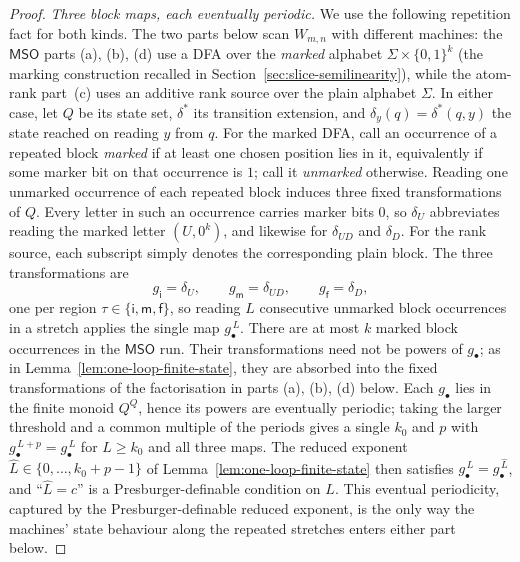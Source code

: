 \documentclass[10pt,a4paper]{amsart}
\newcommand{\MSO}{\mathsf{MSO}}
\begin{document}
\begin{proof}
\vspace{0.5em}
\noindent\emph{Three block maps, each eventually periodic.}
We use the following repetition fact for both kinds.  The two parts below
scan $W_{m,n}$ with different machines: the $\MSO$ parts
(a), (b), (d) use a DFA over the \emph{marked} alphabet
$\Sigma\times\{0,1\}^k$ (the marking construction recalled in
Section~\ref{sec:slice-semilinearity}), while the atom-rank part~(c) uses an additive
rank source over the plain alphabet $\Sigma$.  In either case, let $Q$ be its
state set, $\delta^*$ its transition extension, and $\delta_y(q)=\delta^*(q,y)$
the state reached on reading $y$ from $q$.  For the marked DFA, call an
occurrence of a repeated block \emph{marked} if at least one chosen position
lies in it, equivalently if some marker bit on that occurrence is $1$; call it
\emph{unmarked} otherwise.  Reading one unmarked occurrence of each repeated
block induces three fixed transformations of $Q$.  Every letter in such an
occurrence carries marker bits $0$, so $\delta_U$ abbreviates reading the
marked letter $(U,0^k)$, and likewise for $\delta_{UD}$ and $\delta_D$.  For
the rank source, each subscript simply denotes the corresponding plain block.
The three transformations are
\[
   g_{\mathsf i}=\delta_U,\qquad g_{\mathsf m}=\delta_{UD},\qquad
   g_{\mathsf f}=\delta_D,
\]
one per region $\tau\in\{\mathsf i,\mathsf m,\mathsf f\}$, so reading $L$
consecutive unmarked block occurrences in a stretch applies the single map
$g_\bullet^{\,L}$.  There are at most $k$ marked block occurrences in the
$\MSO$ run.  Their transformations need not be powers of $g_\bullet$; as in
Lemma~\ref{lem:one-loop-finite-state}, they are absorbed into the fixed
transformations of the factorisation in parts (a), (b), (d) below.  Each
$g_\bullet$ lies in the finite monoid $Q^Q$, hence its powers are
eventually periodic; taking the larger threshold and a common multiple of the
periods gives a single $k_0$ and $p$ with $g_\bullet^{\,L+p}=g_\bullet^{\,L}$
for $L\ge k_0$ and all three maps.  The reduced exponent
$\widehat L\in\{0,\ldots,k_0+p-1\}$ of Lemma~\ref{lem:one-loop-finite-state}
then satisfies $g_\bullet^{\,L}=g_\bullet^{\,\widehat L}$, and ``$\widehat L=c$''
is a Presburger-definable condition on $L$.  This eventual periodicity, captured by the
Presburger-definable reduced exponent, is the only way the machines' state
behaviour along the repeated stretches enters either part below.


\end{proof}
\end{document}
